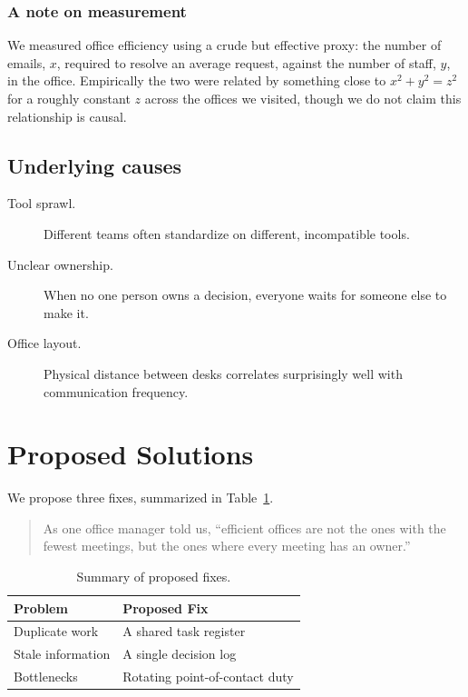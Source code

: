 \documentclass{article}
\begin{document}
\subsubsection{A note on measurement}

We measured office efficiency using a crude but effective proxy: the number of emails,
$x$, required to resolve an average request, against the number of staff, $y$, in the
office. Empirically the two were related by something close to $x^2 + y^2 = z^2$ for a
roughly constant $z$ across the offices we visited, though we do not claim this relationship
is causal.

\subsection{Underlying causes}

\begin{description}
  \item[Tool sprawl.] Different teams often standardize on different, incompatible tools.
  \item[Unclear ownership.] When no one person owns a decision, everyone waits for someone
    else to make it.
  \item[Office layout.] Physical distance between desks correlates surprisingly well with
    communication frequency.
\end{description}

\section{Proposed Solutions}
\label{sec:solutions}

We propose three fixes, summarized in Table~\ref{tab:solutions}.

\begin{quote}
As one office manager told us, ``efficient offices are not the ones with the fewest
meetings, but the ones where every meeting has an owner.''
\end{quote}

\begin{table}[h]
\centering
\begin{tabular}{|l|l|}
\hline
Problem & Proposed Fix \\
\hline
Duplicate work & A shared task register \\
Stale information & A single decision log \\
Bottlenecks & Rotating point-of-contact duty \\
\hline
\end{tabular}
\caption{Summary of proposed fixes.}
\label{tab:solutions}
\end{table}
\end{document}
